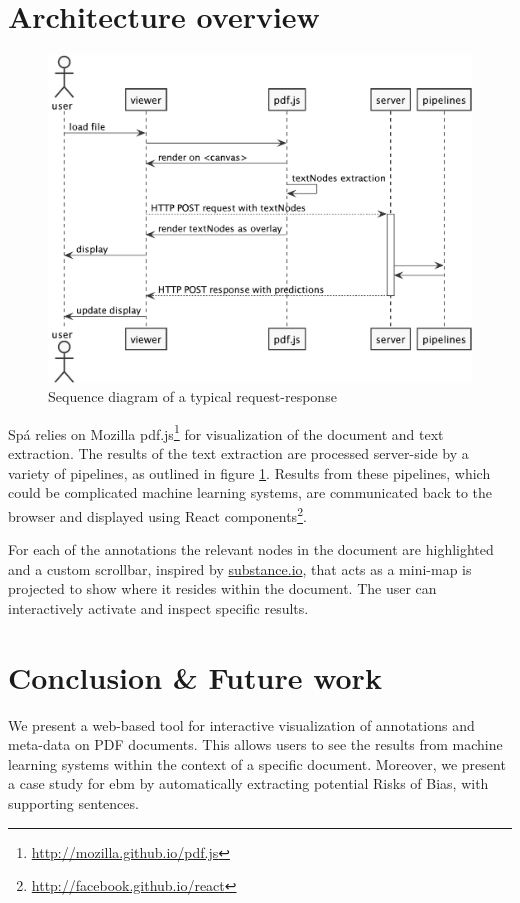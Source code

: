 \documentclass[runningheads,a4paper]{llncs}
\begin{document}
\section{Architecture overview}
\label{section:architecture}
\begin{figure}[htb]
\centering
\includegraphics[width=.9\linewidth]{./diagrams/sequence.pdf}
\caption{\label{fig:sequence}Sequence diagram of a typical request-response}
\end{figure}
Spá relies on Mozilla pdf.js\footnote{\url{http://mozilla.github.io/pdf.js}} for visualization of the document and text extraction.
The results of the text extraction are processed server-side by a variety of pipelines, as outlined in figure \ref{fig:sequence}.
Results from these pipelines, which could be complicated machine learning systems, are communicated back to the browser and displayed using React components\footnote{\url{http://facebook.github.io/react}}.

For each of the annotations the relevant nodes in the document are highlighted and a custom scrollbar, inspired by \href{http://substance.io/}{substance.io}, that acts as a mini-map is projected to show where it resides within the document.
The user can interactively activate and inspect specific results.

\section{Conclusion \& Future work}
We present a web-based tool for interactive visualization of annotations and meta-data on PDF documents.
This allows users to see the results from machine learning systems within the context of a specific document.
Moreover, we present a case study for \ac{ebm} by automatically extracting potential Risks of Bias, with supporting sentences.
\end{document}
